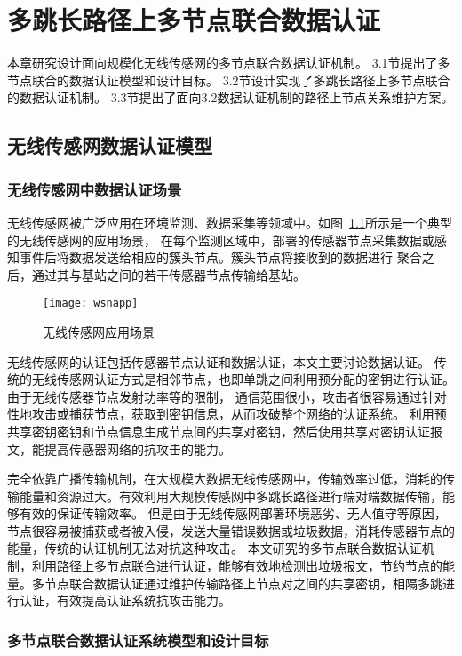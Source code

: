 \chapter{多跳长路径上多节点联合数据认证}
本章研究设计面向规模化无线传感网的多节点联合数据认证机制。
3.1节提出了多节点联合的数据认证模型和设计目标。
3.2节设计实现了多跳长路径上多节点联合的数据认证机制。
3.3节提出了面向3.2数据认证机制的路径上节点关系维护方案。

\section{无线传感网数据认证模型}

\subsection{无线传感网中数据认证场景}
无线传感网被广泛应用在环境监测、数据采集等领域中。如图~\ref{fig:wsn}所示是一个典型的无线传感网的应用场景，
在每个监测区域中，部署的传感器节点采集数据或感知事件后将数据发送给相应的簇头节点。簇头节点将接收到的数据进行
聚合之后，通过其与基站之间的若干传感器节点传输给基站。
\begin{figure}[htbp]
  \centering
  \texttt{[image: wsnapp]}
  \caption{无线传感网应用场景}
  \label{fig:wsn}
\end{figure}

无线传感网的认证包括传感器节点认证和数据认证，本文主要讨论数据认证。
传统的无线传感网认证方式是相邻节点，也即单跳之间利用预分配的密钥进行认证。由于无线传感器节点发射功率等的限制，
通信范围很小，攻击者很容易通过针对性地攻击或捕获节点，获取到密钥信息，从而攻破整个网络的认证系统。
利用预共享密钥密钥和节点信息生成节点间的共享对密钥，然后使用共享对密钥认证报文，能提高传感器网络的抗攻击的能力。

完全依靠广播传输机制，在大规模大数据无线传感网中，传输效率过低，消耗的传输能量和资源过大。有效利用大规模传感网中多跳长路径进行端对端数据传输，能够有效的保证传输效率。
但是由于无线传感网部署环境恶劣、无人值守等原因，节点很容易被捕获或者被入侵，发送大量错误数据或垃圾数据，消耗传感器节点的能量，传统的认证机制无法对抗这种攻击。
本文研究的多节点联合数据认证机制，利用路径上多节点联合进行认证，能够有效地检测出垃圾报文，节约节点的能量。多节点联合数据认证通过维护传输路径上节点对之间的共享密钥，相隔多跳进行认证，有效提高认证系统抗攻击能力。

\subsection{多节点联合数据认证系统模型和设计目标}
